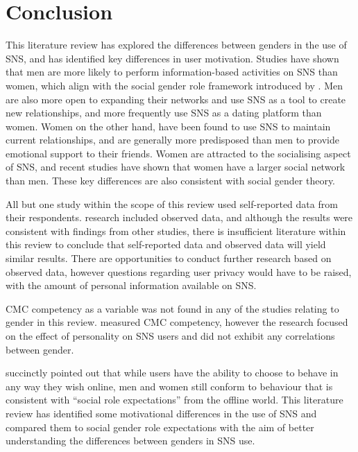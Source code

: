 \section{Conclusion}

This literature review has explored the differences between genders in the use of SNS, and has identified key differences in user motivation. Studies have shown that men are more likely to perform information-based activities on SNS than women, which align with the social gender role framework introduced by \citet{Eagly1987}. Men are also more open to expanding their networks and use SNS as a tool to create new relationships, and more frequently use SNS as a dating platform than women. Women on the other hand, have been found to use SNS to maintain current relationships, and are generally more predisposed than men to provide emotional support to their friends. Women are attracted to the socialising aspect of SNS, and recent studies have shown that women have a larger social network than men. These key differences are also consistent with social gender theory.

All but one study within the scope of this review used self-reported data from their respondents.  research included observed data, and although the results were consistent with findings from other studies, there is insufficient literature within this review to conclude that self-reported data and observed data will yield similar results. There are opportunities to conduct further research based on observed data, however questions regarding user privacy would have to be raised, with the amount of personal information available on SNS.

CMC competency as a variable was not found in any of the studies relating to gender in this review. \citet{Ross2009} measured CMC competency, however the research focused on the effect of personality on SNS users and did not exhibit any correlations between gender.

\citet[p. 897]{Kimbrough2013} succinctly pointed out that while users have the ability to choose to behave in any way they wish online, men and women still conform to behaviour that is consistent with ``social role expectations'' from the offline world. This literature review has identified some motivational differences in the use of SNS and compared them to social gender role expectations with the aim of better understanding the differences between genders in SNS use.